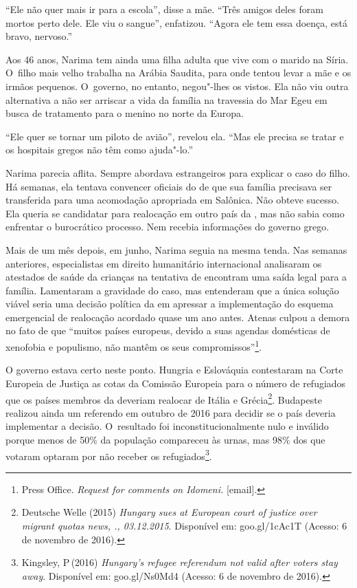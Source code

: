 ``Ele não quer mais ir para a escola'', disse a mãe. ``Três amigos deles
foram mortos perto dele. Ele viu o sangue'', enfatizou. ``Agora ele tem
essa doença, está bravo, nervoso.''

Aos 46 anos, Narima tem ainda uma filha adulta que vive com o marido na
Síria. O~filho mais velho trabalha na Arábia Saudita, para onde tentou
levar a mãe e os irmãos pequenos. O~governo, no entanto, negou"-lhes os
vistos. Ela não viu outra alternativa a não ser arriscar a vida da
família na travessia do Mar Egeu em busca de tratamento para o menino no
norte da Europa.

``Ele quer se tornar um piloto de avião'', revelou ela. ``Mas ele
precisa se tratar e os hospitais gregos não têm como ajuda"-lo.''

Narima parecia aflita. Sempre abordava estrangeiros para explicar o caso
do filho. Há semanas, ela tentava convencer oficiais do  de que sua
família precisava ser transferida para uma acomodação apropriada em
Salônica. Não obteve sucesso. Ela queria se candidatar para realocação
em outro país da , mas não sabia como enfrentar o burocrático
processo. Nem recebia informações do governo grego.

Mais de um mês depois, em junho, Narima seguia na mesma tenda. Nas
semanas anteriores, especialistas em direito humanitário internacional
analisaram os atestados de saúde da crianças na tentativa de encontram
uma saída legal para a família. Lamentaram a gravidade do caso, mas
entenderam que a única solução viável seria uma decisão política da 
em apressar a implementação do esquema emergencial de realocação
acordado quase um ano antes. Atenas culpou a demora no fato de que
``muitos países europeus, devido a suas agendas domésticas de xenofobia
e populismo, não mantêm os seus compromissos''\footnote{ Press Office. \emph{Request for comments on
Idomeni}\emph{.} {[}email{]}.}.

O governo estava certo neste ponto. Hungria e Eslováquia contestaram na
Corte Europeia de Justiça as cotas da Comissão Europeia para o número de
refugiados que os países membros da  deveriam realocar de Itália e
Grécia\footnote{ Deutsche Welle (2015) \emph{Hungary sues  at
European court of justice over migrant quotas \textbar{} news,
., 03.12.2015}. Disponível em:
goo.gl/1cAc1T
(Acesso: 6 de novembro de 2016).}. Budapeste realizou ainda um referendo em
outubro de 2016 para decidir se o país deveria implementar a decisão. O~resultado foi inconstitucionalmente nulo e inválido porque menos de 50\%
da população compareceu às urnas, mas 98\% dos que votaram optaram por
não receber os refugiados\footnote{ Kingsley, P\,(2016) \emph{Hungary's refugee
referendum not valid after voters stay away}. Disponível em:
goo.gl/Ns0Md4
(Acesso: 6 de novembro de 2016).}.

